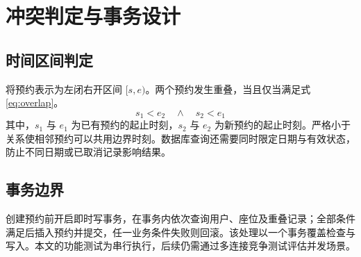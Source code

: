 \section{冲突判定与事务设计}
\subsection{时间区间判定}
将预约表示为左闭右开区间 $[s,e)$。两个预约发生重叠，当且仅当满足式\eqref{eq:overlap}。
\begin{equation}
  s_1 < e_2 \quad \land \quad s_2 < e_1
  \label{eq:overlap}
\end{equation}
其中，$s_1$ 与 $e_1$ 为已有预约的起止时刻，$s_2$ 与 $e_2$ 为新预约的起止时刻。严格小于关系使相邻预约可以共用边界时刻。数据库查询还需要同时限定日期与有效状态，防止不同日期或已取消记录影响结果。

\subsection{事务边界}
创建预约前开启即时写事务，在事务内依次查询用户、座位及重叠记录；全部条件满足后插入预约并提交，任一业务条件失败则回滚。该处理以一个事务覆盖检查与写入。本文的功能测试为串行执行，后续仍需通过多连接竞争测试评估并发场景。
